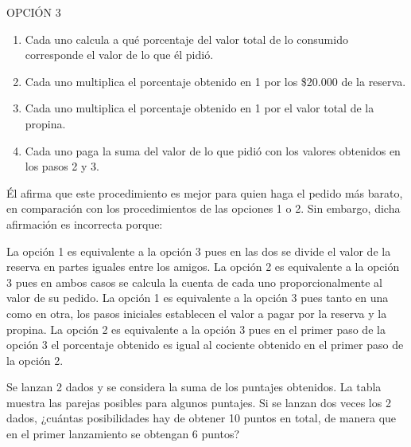 \documentclass[10pt,addpoints]{exam}
\begin{document}
\begin{questions}
OPCIÓN 3
\begin{enumerate}
\item Cada uno calcula a qué porcentaje del valor total de lo consumido corresponde el valor de lo que él pidió.
\item Cada uno multiplica el porcentaje obtenido en 1 por los \$20.000 de la reserva.
\item Cada uno multiplica el porcentaje obtenido en 1 por el valor total de la propina.
\item Cada uno paga la suma del valor de lo que pidió con los valores obtenidos en los pasos 2 y 3.
\end{enumerate}
Él afirma que este procedimiento es mejor para quien haga el pedido más barato, en comparación con los procedimientos de las opciones 1 o 2. Sin embargo, dicha afirmación es incorrecta porque:
\begin{choices}
\choice La opción 1 es equivalente a la opción 3 pues en las dos se divide el valor de la reserva en partes iguales entre los amigos.
\CorrectChoice La opción 2 es equivalente a la opción 3 pues en ambos casos se calcula la cuenta de cada uno proporcionalmente al valor de su pedido.
\choice La opción 1 es equivalente a la opción 3 pues tanto en una como en otra, los pasos iniciales establecen el valor a pagar por la reserva y la propina.
\choice La opción 2 es equivalente a la opción 3 pues en el primer paso de la opción 3 el porcentaje obtenido es igual al cociente obtenido en el primer paso de la opción 2.
\end{choices}
\question Se lanzan 2 dados y se considera la suma de los puntajes obtenidos. La tabla muestra las parejas posibles para algunos puntajes.
Si se lanzan dos veces los 2 dados, ¿cuántas posibilidades hay de obtener 10 puntos en total, de manera que en el primer lanzamiento se obtengan 6 puntos?


\end{questions}
\end{document}
